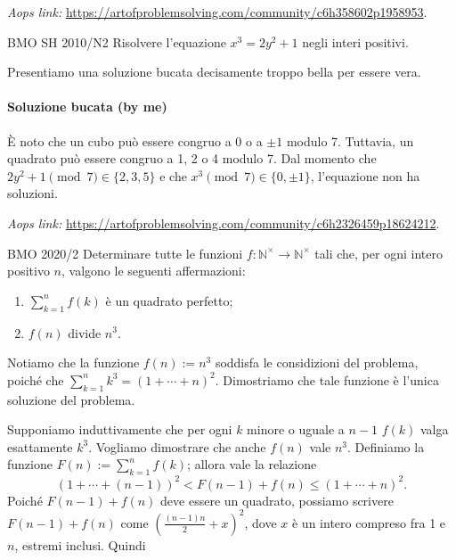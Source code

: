 \documentclass{article}
\begin{document}
\vspace{0.5cm}
\textit{Aops link:}
\href{https://artofproblemsolving.com/community/c6h358602p1958953}
{https://artofproblemsolving.com/community/c6h358602p1958953}.

\begin{proposition}{BMO SH 2010/N2}{}
	Risolvere l'equazione $x^3=2y^2+1$ negli interi positivi.
\end{proposition}
Presentiamo una soluzione bucata decisamente troppo bella per essere vera.

\paragraph{Soluzione bucata (by me)}
È noto che un cubo può essere congruo a $0$ o a $\pm 1$ modulo 7.
Tuttavia, un quadrato può essere congruo a 1, 2 o 4 modulo 7.
Dal momento che $2y^2+1 \pmod{7} \in \{2,3,5 \}$ e che
$x^3 \pmod{7} \in \{ 0,\pm 1\}$, l'equazione non ha soluzioni.

\vspace{0.5cm}
\textit{Aops link:}
\href{https://artofproblemsolving.com/community/c6h2326459p18624212}
{https://artofproblemsolving.com/community/c6h2326459p18624212}.

\begin{proposition}{BMO 2020/2}{}
	Determinare tutte le funzioni
	$f:\mathbb{N^{\times}}\rightarrow\mathbb{N^{\times}}$ tali che, per ogni
	intero positivo $n$, valgono le seguenti affermazioni:
	\begin{enumerate}
		\item $ \sum_{k=1}^{n} f(k) $ è un quadrato perfetto;
		\item $f(n)$ divide $n^3$.
	\end{enumerate}
\end{proposition}

Notiamo che la funzione $f(n):=n^3$ soddisfa le considizioni
del problema, poiché che $\sum_{k=1}^n k^3=(1+\cdots+n)^2$.
Dimostriamo che tale funzione è l'unica soluzione del problema.

Supponiamo induttivamente che per ogni $k$ minore o uguale a $n-1$
$f(k)$ valga esattamente $k^3$. Vogliamo dimostrare che
anche $f(n)$ vale $n^3$. Definiamo la funzione $F(n):=\sum_{k=1}^n f(k)$;
allora vale la relazione
\begin{equation*}
	(1+\cdots+(n-1))^2<F(n-1)+f(n)\le (1+\cdots+n)^2.
\end{equation*}
Poiché $F(n-1)+f(n)$ deve essere un quadrato,
possiamo scrivere $F(n-1)+f(n)$ come $\left(\frac{(n-1)n}{2}+x\right)^2$, dove
$x$ è un intero compreso fra 1 e $n$, estremi inclusi. Quindi
\end{document}
